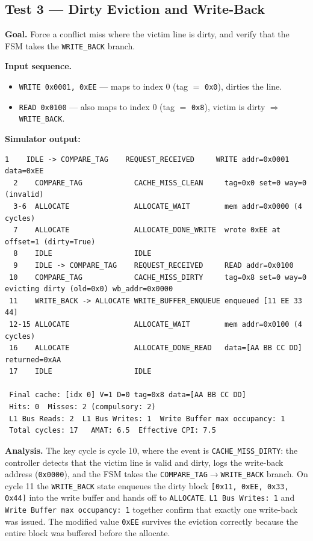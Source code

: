 \documentclass[11pt,a4paper]{article}
\begin{document}
\subsection{Test 3 — Dirty Eviction and Write-Back}

\textbf{Goal.} Force a conflict miss where the victim line is dirty, and
verify that the FSM takes the \texttt{WRITE\_BACK} branch.

\textbf{Input sequence.}
\begin{itemize}[leftmargin=1.4em,itemsep=0.05em]
    \item \texttt{WRITE 0x0001, 0xEE} — maps to index 0 (tag $=$ \texttt{0x0}), dirties the line.
    \item \texttt{READ 0x0100} — also maps to index 0 (tag $=$ \texttt{0x8}), victim is dirty $\Rightarrow$ \texttt{WRITE\_BACK}.
\end{itemize}

\textbf{Simulator output:}
\begin{lstlisting}[style=trace]
  1    IDLE -> COMPARE_TAG    REQUEST_RECEIVED     WRITE addr=0x0001 data=0xEE
  2    COMPARE_TAG            CACHE_MISS_CLEAN     tag=0x0 set=0 way=0 (invalid)
  3-6  ALLOCATE               ALLOCATE_WAIT        mem addr=0x0000 (4 cycles)
  7    ALLOCATE               ALLOCATE_DONE_WRITE  wrote 0xEE at offset=1 (dirty=True)
  8    IDLE                   IDLE
  9    IDLE -> COMPARE_TAG    REQUEST_RECEIVED     READ addr=0x0100
 10    COMPARE_TAG            CACHE_MISS_DIRTY     tag=0x8 set=0 way=0 evicting dirty (old=0x0) wb_addr=0x0000
 11    WRITE_BACK -> ALLOCATE WRITE_BUFFER_ENQUEUE enqueued [11 EE 33 44]
 12-15 ALLOCATE               ALLOCATE_WAIT        mem addr=0x0100 (4 cycles)
 16    ALLOCATE               ALLOCATE_DONE_READ   data=[AA BB CC DD] returned=0xAA
 17    IDLE                   IDLE

 Final cache: [idx 0] V=1 D=0 tag=0x8 data=[AA BB CC DD]
 Hits: 0  Misses: 2 (compulsory: 2)
 L1 Bus Reads: 2  L1 Bus Writes: 1  Write Buffer max occupancy: 1
 Total cycles: 17   AMAT: 6.5  Effective CPI: 7.5
\end{lstlisting}

\textbf{Analysis.} The key cycle is cycle 10, where the event is
\texttt{CACHE\_MISS\_DIRTY}: the controller detects that the victim line is
valid and dirty, logs the write-back address (\texttt{0x0000}), and the FSM
takes the \texttt{COMPARE\_TAG}$\to$\texttt{WRITE\_BACK} branch. On cycle 11
the \texttt{WRITE\_BACK} state enqueues the dirty block
\texttt{[0x11, 0xEE, 0x33, 0x44]} into the write buffer and hands off to
\texttt{ALLOCATE}. \texttt{L1 Bus Writes: 1} and
\texttt{Write Buffer max occupancy: 1} together confirm that exactly one
write-back was issued. The modified value \texttt{0xEE} survives the eviction
correctly because the entire block was buffered before the allocate.
\end{document}
